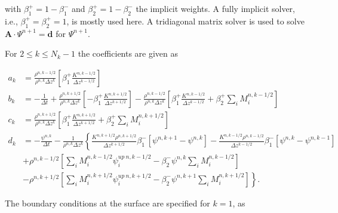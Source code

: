 \documentclass[dvipdfmx,a4paper,10pt]{article}
\begin{document}
with $\beta_1^+=1-\beta_1^-$ and $\beta_2^+=1-\beta_2^-$ the implicit weights. A fully implicit solver, i.e., $\beta_1^{+}=\beta_2^{+}=1$, is mostly used here. A tridiagonal matrix solver is used to solve $\mathbf{A}\cdot\Psi^{n+1}=\mathbf{d}$ for $\Psi^{n+1}$. 

\noindent For $2\leq k \leq N_k-1$ the coefficients are given as 

\begin{align*}
  a_k &=  \frac{\rho^{n,k-1/2}}{\rho^{n,k}\Delta z^k} \left[\beta_1^+ \frac{K^{n,k-1/2}}{\Delta z ^{k-1/2}}\right]\\
    b_k &= -\frac{1}{\Delta t} + \frac{\rho^{n,k+1/2}}{\rho^{n,k}\Delta z^k} \left[-\beta_1^+\frac{K^{n,k+1/2}}{\Delta z ^{k+1/2}} \right]-\frac{\rho^{n,k-1/2}}{\rho^{n,k}\Delta z^k} \left[\beta_1^+\frac{K^{n,k-1/2}}{\Delta z ^{k-1/2}}+\beta_2^+\sum_iM_i^{n,k-1/2} \right] \\
      c_k &= \frac{\rho^{n,k+1/2}}{\rho^{n,k}\Delta z^k}\left[\beta_1^+ \frac{K^{n,k+1/2}}{\Delta z ^{k+1/2}}+\beta_2^+\sum_iM_i^{n,k+1/2} \right] \\
      d_k &=-\frac{\psi^{n,k}}{\Delta t} - \frac{1}{\rho^{n,k}\Delta z^k} \left\{ \frac{K^{n,k+1/2}\rho^{n,k+1/2}}{\Delta z^{k+1/2}}\beta_1^{-}\left[\psi^{n,k+1} - \psi^{n,k}\right]-\frac{K^{n,k-1/2}\rho^{n,k-1/2}}{\Delta z^{k-1/2}}\beta_1^{-}\left[\psi^{n,k} - \psi^{n,k-1}\right]\right.   \\   
          & \left.+\rho^{n,k-1/2}\left[\sum_iM_i^{n,k-1/2}\psi_i^{up~n,k-1/2} - \beta_2^{-}\psi^{n,k}\sum_iM_i^{n,k-1/2} \right]\right.\\
          & \left. -\rho^{n,k+1/2}\left[\sum_iM_i^{n,k+1/2}\psi_i^{up~n,k+1/2} - \beta_2^{-}\psi^{n,k+1}\sum_iM_i^{n,k+1/2} \right] \right\}.
\end{align*}

\noindent The boundary conditions at the surface are specified for $k=1$, as
\end{document}
